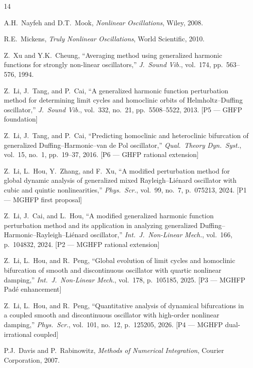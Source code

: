\documentclass[11pt,a4paper]{article}
\begin{document}
\begin{thebibliography}{14}

A.H.\ Nayfeh and D.T.\ Mook, \textit{Nonlinear Oscillations}, Wiley, 2008.

R.E.\ Mickens, \textit{Truly Nonlinear Oscillations}, World Scientific, 2010.

Z.\ Xu and Y.K.\ Cheung, ``Averaging method using generalized harmonic functions for strongly non-linear oscillators,'' \textit{J.\ Sound Vib.}, vol.\ 174, pp.\ 563--576, 1994.

Z.\ Li, J.\ Tang, and P.\ Cai, ``A generalized harmonic function perturbation method for determining limit cycles and homoclinic orbits of Helmholtz--Duffing oscillator,'' \textit{J.\ Sound Vib.}, vol.\ 332, no.\ 21, pp.\ 5508--5522, 2013. [P5 --- GHFP foundation]

Z.\ Li, J.\ Tang, and P.\ Cai, ``Predicting homoclinic and heteroclinic bifurcation of generalized Duffing--Harmonic--van de Pol oscillator,'' \textit{Qual.\ Theory Dyn.\ Syst.}, vol.\ 15, no.\ 1, pp.\ 19--37, 2016. [P6 --- GHFP rational extension]

Z.\ Li, L.\ Hou, Y.\ Zhang, and F.\ Xu, ``A modified perturbation method for global dynamic analysis of generalized mixed Rayleigh--Li\'enard oscillator with cubic and quintic nonlinearities,'' \textit{Phys.\ Scr.}, vol.\ 99, no.\ 7, p.\ 075213, 2024. [P1 --- MGHFP first proposal]

Z.\ Li, J.\ Cai, and L.\ Hou, ``A modified generalized harmonic function perturbation method and its application in analyzing generalized Duffing--Harmonic--Rayleigh--Li\'enard oscillator,'' \textit{Int.\ J.\ Non-Linear Mech.}, vol.\ 166, p.\ 104832, 2024. [P2 --- MGHFP rational extension]

Z.\ Li, L.\ Hou, and R.\ Peng, ``Global evolution of limit cycles and homoclinic bifurcation of smooth and discontinuous oscillator with quartic nonlinear damping,'' \textit{Int.\ J.\ Non-Linear Mech.}, vol.\ 178, p.\ 105185, 2025. [P3 --- MGHFP Pad\'e enhancement]

Z.\ Li, L.\ Hou, and R.\ Peng, ``Quantitative analysis of dynamical bifurcations in a coupled smooth and discontinuous oscillator with high-order nonlinear damping,'' \textit{Phys.\ Scr.}, vol.\ 101, no.\ 12, p.\ 125205, 2026. [P4 --- MGHFP dual-irrational coupled]

P.J.\ Davis and P.\ Rabinowitz, \textit{Methods of Numerical Integration}, Courier Corporation, 2007.


\end{thebibliography}
\end{document}
